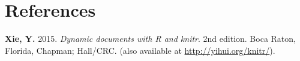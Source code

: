 \documentclass[
  10pt,
  b5paper,
  oneside]{book}
\newlength{\cslhangindent}
\newlength{\cslentryspacingunit} %
\newenvironment{CSLReferences}[2] %
 {%
  \setlength{\parindent}{0pt}
  \ifodd #1
  \let\oldpar\par
  \def\par{\hangindent=\cslhangindent\oldpar}
  \fi
  \setlength{\parskip}{#2\cslentryspacingunit}
 }%
 {}
\theoremstyle{definition}
\theoremstyle{definition}
\theoremstyle{definition}
\theoremstyle{definition}
\theoremstyle{remark}
\begin{document}
\hypertarget{references}{%
\chapter*{References}\label{references}}

\hypertarget{refs}{}
\begin{CSLReferences}{0}{0}
\leavevmode{}%
\textbf{Xie, Y.} 2015. \emph{Dynamic documents with {R} and knitr}. 2nd edition. Boca Raton, Florida, Chapman; Hall/CRC. (also available at \url{http://yihui.org/knitr/}).

\end{CSLReferences}


\end{document}

